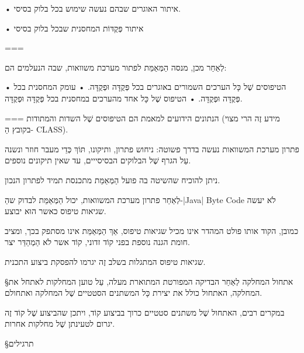 • איתור האוגרים שבהם נעשה שימוש בכל בלוק בסיסי.

• איתור פְּקֻדּוֹת המחסנית שבכל בלוק בסיסי

===

לְאַחַר מכן, מנסה הַמְּאַמֵּת לפתור מערכת משוואות, שבה הנעלמים הם:

• הטיפוסים שֶׁל כָּל הערכים השמורים באוגרים בכל פְּקֻדָּה וּפְקֻדָּה.
• עומק המחסנית בכל פְּקֻדָּה וּפְקֻדָּה.
• הטיפוס שֶׁל כָּל אחד מהערכים במחסנית בכל פְּקֻדָּה וּפְקֻדָּה.

===
הנתונים הידועים למאמת הם הטיפוסים שֶׁל השדות והמתודות (מידע זֶה הרי מצוי בקובץ
הַ- CLASS).

פתרון מערכת המשוואות נעשה בדרך פשוטה: ניחוש פתרון, ותיקונו, תּוֹךְ כְּדֵי מעבר
חוזר ונשנה עַל הגרף שֶׁל הבלוקים הבסיסייים, עד שאין תיקונים נוספים.

ניתן להוכיח שהשיטה בה פועל הַמְּאַמֵּת מתכנסת תמיד לפתרון הנכון.

לְאַחַר פתרון מערכת המשוואות, יכול הַמְּאַמֵּת לבדוק שהַ-|Java| Byte Code לֹא יעשה
שגיאות טיפוס כאשר הוּא יבוצע.

כמובן, הקוד אותו פולט המהדר אינו מכיל שגיאות טיפוס, אַךְ הַמְּאַמֵּת אינו
מסתפק בכך, ומציב חומת הגנה נוספת בפני קוֹד זדוני, קוֹד אשר לֹא הַמְהַדֵּר
יצר.

שגיאות טיפוס המתגלות בשלב זֶה יגרמו להפסקת ביצוע התכנית.

§אתחול המחלקה
לְאַחַר הבדיקה המפורטת המתוארת מעלה, עַל טוען המחלקות לאתחל את
המחלקה, האתחול כולל את יצירת כָּל המשתנים הסטטיים שֶׁל המחלקה
ואתחולם.

במקרים רבים, האתחול שֶׁל משתנים סטטיים כרוך בביצוע קוֹד, ויתכן שהביצוע שֶׁל קוֹד
זֶה יגרום לטעינתן שֶׁל מחלקות אחרות.

§תרגילים

